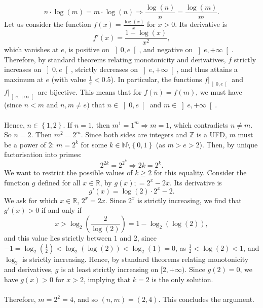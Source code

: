 \documentclass[11pt, a4paper, oneside]{article}
\theoremstyle{remark}
\theoremstyle{lemma}
\begin{document}
\[
n \cdot \log\left( m \right) = m \cdot \log\left( n \right) \Rightarrow \frac{\log\left( n \right)}{n} = \frac{\log\left( m \right)}{m}.
\]
Let us consider the function \( f\left( x \right) = \frac{\log\left( x \right)}{x} \) for \( x > 0 \). Its derivative is  
\[
f'\left( x \right) = \frac{1 - \log\left( x \right)}{x^2},
\]
which vanishes at \( e \), is positive on \( \left] 0,e \right[ \), and negative on \( \left] e,+\infty \right[ \). Therefore, by standard theorems relating monotonicity and derivatives, \( f \) strictly increases on \( \left] 0,e \right[ \), strictly decreases on \( \left] e,+\infty \right[ \), and thus attains a maximum at \( e \) (with value \( \frac{1}{e} < 0.5 \)). In particular, the functions \( f|_{\left] 0,e \right[} \) and \( f|_{\left] e,+\infty \right[} \) are bijective. This means that for \( f(n) = f(m) \), we must have (since \( n < m \) and \( n,m \neq e \)) that \( n \in \left] 0,e \right[ \) and \( m \in \left] e,+\infty \right[ \).  
\\\\
Hence, \( n \in \left\{ 1,2 \right\} \). If \( n = 1 \), then \( m^1 = 1^m \Rightarrow m = 1 \), which contradicts \( n \neq m \). So \( n = 2 \). Then \( m^2 = 2^m \). Since both sides are integers and \( \mathbb{Z} \) is a UFD, \( m \) must be a power of \( 2 \): \( m = 2^k \) for some \( k \in \mathbb{N} \setminus \left\{ 0,1 \right\} \) (as \( m > e > 2 \)). Then, by unique factorisation into primes:  
\[
2^{2k} = 2^{2^k} \Rightarrow 2k = 2^k.
\]
We want to restrict the possible values of \( k\geq 2 \) for this equality. Consider the function $g$ defined for all \( x \in \mathbb{R} \), by \( g(x) ;= 2^x - 2x \). Its derivative is  
\[
g'\left( x \right) = \log(2) \cdot 2^x - 2.
\]
We ask for which \( x \in \mathbb{R} \), \( 2^x = 2x \). Since \( 2^x \) is strictly increasing, we find that \( g'(x) > 0 \) if and only if  
\[
x > \log_2\left( \frac{2}{\log(2)} \right) = 1 - \log_2\left( \log(2) \right),
\]
and this value lies strictly between \( 1 \) and \( 2 \), since \( -1 = \log_2\left( \frac{1}{2} \right) < \log_2\left( \log(2) \right) < \log_2(1) = 0 \), as \( \frac{1}{2} < \log(2) < 1 \), and \( \log_2 \) is strictly increasing. Hence, by standard theorems relating monotonicity and derivatives, \( g \) is at least strictly increasing on \( [2,+\infty) \). Since \( g(2) = 0 \), we have \( g(x) > 0 \) for \( x > 2 \), implying that \( k = 2 \) is the only solution.  
\\\\
Therefore, \( m = 2^2 = 4 \), and so \( \left( n,m \right) = \left( 2,4 \right) \). This concludes the argument.  
\end{document}
